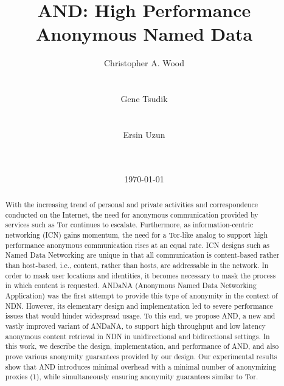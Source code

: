 \documentclass{acm_proc_article-sp}
\begin{document}
\title{AND: High Performance Anonymous Named Data}

\author{
\alignauthor
Christopher A. Wood\\
       \\
       \\
\alignauthor
Gene Tsudik\\
       \\
       \\
\alignauthor 
Ersin Uzun\\
       \\
       \\
}
\date{\today}

\maketitle
\begin{abstract}
With the increasing trend of personal and private activities and correspondence conducted on the Internet, the need for anonymous communication provided by services such as Tor continues to escalate. Furthermore, as information-centric networking (ICN) gains momentum, the need for a Tor-like analog to support high performance anonymous communication rises at an equal rate. ICN designs such as Named Data Networking are unique in that all communication is content-based rather than host-based, i.e., content, rather than hosts, are addressable in the network. In order to mask user locations and identities, it becomes necessary to mask the process in which content is requested. {\sf ANDaNA} (Anonymous Named Data Networking Application) was the first attempt to provide this type of anonymity in the context of NDN. However, its elementary design and implementation led to severe performance issues that would hinder widespread usage. To this end, we propose {\sf AND}, a new and vastly improved variant of {\sf ANDaNA}, to support high throughput and low latency anonymous content retrieval in NDN in unidirectional and bidirectional settings. In this work, we describe the design, implementation, and performance of {\sf AND}, and also prove various anonymity guarantees provided by our design. Our experimental results show that {\sf AND} introduces minimal overhead with a minimal number of anonymizing proxies (1), while simultaneously ensuring anonymity guarantees similar to Tor.
\end{abstract}
\end{document}
